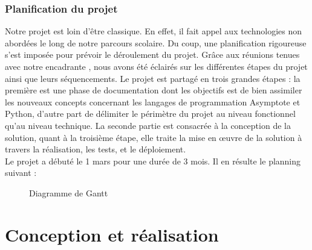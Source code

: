\documentclass[a4paper]{report}
\begin{document}
\subsection{Planification du projet}
Notre projet est loin d’être classique. En effet, il fait appel aux technologies non abordées le long de notre parcours scolaire. Du coup, une planification rigoureuse s’est imposée pour prévoir le déroulement du projet. Grâce aux réunions tenues avec notre encadrante , nous avons été éclairés sur les différentes étapes du projet ainsi que leurs séquencements. Le projet est partagé en trois grandes étapes : la première est une phase de documentation dont les objectifs est de bien assimiler les nouveaux concepts concernant les langages de programmation Asymptote et Python, d’autre part de délimiter le périmètre du projet au niveau
fonctionnel qu’au niveau technique. La seconde partie est consacrée à la conception de la solution, quant à la troisième étape, elle traite la mise en œuvre de la solution à travers la réalisation, les tests, et le déploiement.\\
Le projet a débuté le 1 mars pour une durée de 3 mois. Il en résulte le planning suivant :
\begin{figure}[!h]
    \centering
    \caption{Diagramme de Gantt}
    \label{fig:Diagramme de Gantt}
\end{figure}
\chapter{Conception et réalisation}
\end{document}
